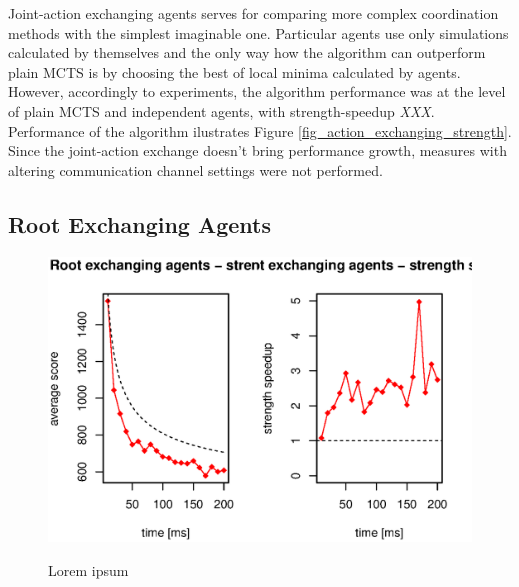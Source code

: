 Joint-action exchanging agents serves for comparing more complex coordination methods with the
simplest imaginable one. Particular agents use only simulations calculated by themselves and
the only way how the algorithm can outperform plain MCTS is by choosing the best of local
minima calculated by agents. However, accordingly to experiments, the algorithm performance was
at the level of plain MCTS and independent agents, with strength-speedup \emph{XXX}.
Performance of the algorithm ilustrates Figure \ref{fig_action_exchanging_strength}. Since
the joint-action exchange doesn't bring performance growth, measures with altering
communication channel settings were not performed.


\subsection{Root Exchanging Agents}

\begin{figure}
\begin{center}
\includegraphics{img/root-exchange-strength.eps}
\end{center}
\caption{\footnotesize Lorem ipsum}{\footnotesize }
\label{fig_root_exchanging_strength}
\end{figure}


